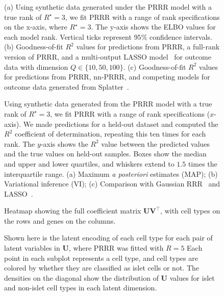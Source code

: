 \documentclass{bmcart}
\begin{document}
\begin{backmatter}
\begin{figure}%
\centering
\caption{ 
(a) Using synthetic data generated under the PRRR model with a true rank of $R^\star = 3$, we fit PRRR with a range of rank specifications on the x-axis, where $R^{\star} = 3$. The y-axis shows the ELBO values for each model rank. Vertical ticks represent $95\%$ confidence intervals.
(b) Goodness-of-fit $R^2$ values for predictions from PRRR, a full-rank version of PRRR, and a multi-output LASSO model~\citep{friedman2010note} for outcome data with dimension $Q \in \{10, 50, 100\}$.
(c) Goodness-of-fit $R^2$ values for predictions from PRRR, nn-PRRR, and competing models for outcome data generated from Splatter~\citep{zappia2017splatter}.
}
\label{fig:rank_recovery_and_highdim_prediction}
\end{figure}

\begin{figure}%
\centering
\caption{ Using synthetic data generated from the PRRR model with a true rank of $R^\star = 3$, we fit PRRR with a range of rank specifications ($x$-axis). We made predictions for a held-out dataset and computed the $R^2$ coefficient of determination, repeating this ten times for each rank. The $y$-axis shows the $R^2$ value between the predicted values and the true values on held-out samples. Boxes show the median and upper and lower quartiles, and whiskers extend to $1.5$ times the interquartile range. (a) Maximum \emph{a posteriori} estimates (MAP); (b) Variational inference (VI); (c) Comparison with Gaussian RRR~\citep{anderson1951estimating} and LASSO~\citep{friedman2010note}.
}
\label{fig:prediction_figure}
\end{figure}

\begin{figure}%
\centering
\caption{ Heatmap showing the full coefficient matrix $\mathbf{U} \mathbf{V}^\top$, with cell types on the rows and genes on the columns.}
\label{fig:coeff_matrix_grrr_heatmap}
\end{figure}

\begin{figure}%
\centering
\caption{ Shown here is the latent encoding of each cell type for each pair of latent variables in $\mathbf{U}$, where PRRR was fitted with $R=5$
Each point in each subplot represents a cell type, and cell types are colored by whether they are classified as islet cells or not. The densities on the diagonal show the distribution of $\mathbf{U}$ values for islet and non-islet cell types in each latent dimension.
}
\label{fig:pairplot_grrr_5x5}
\end{figure}


\end{backmatter}
\end{document}

